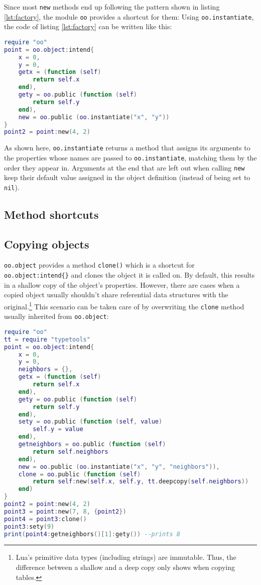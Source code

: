Since most \texttt{new} methods end up following the pattern shown in listing \ref{lst:factory}, the module \texttt{oo} provides a shortcut for them: Using \texttt{oo.instantiate}, the code of listing \ref{lst:factory} can be written like this:

\begin{lstlisting}[language=lua, caption={Rewriting listing \ref{lst:factory} using \texttt{oo.instantiate}}, label=lst:instantiate, name=lst:instantiate]
require "oo"
point = oo.object:intend{
	x = 0,
	y = 0,
	getx = (function (self)
		return self.x
	end),
	gety = oo.public (function (self)
		return self.y
	end),
	new = oo.public (oo.instantiate("x", "y"))
}
point2 = point:new(4, 2)
\end{lstlisting}

As shown here, \texttt{oo.instantiate} returns a method that assigns its arguments to the properties whose names are passed to \texttt{oo.instantiate}, matching them by the order they appear in. Arguments at the end that are left out when calling \texttt{new} keep their default value assigned in the object definition (instead of being set to \texttt{nil}).

\subsection{Method shortcuts}

\subsection{Copying objects}
\label{sec:oo:copying}
\texttt{oo.object} provides a method \texttt{clone()} which is a shortcut for \texttt{oo.object:intend\{\}} and clones the object it is called on. By default, this results in a shallow copy of the object's properties. However, there are cases when a copied object usually shouldn't share referential data structures with the original.\footnote{Lua's primitive data types (including strings) are immutable. Thus, the difference between a shallow and a deep copy only shows when copying tables.} This scenario can be taken care of by overwriting the \texttt{clone} method usually inherited from \texttt{oo.object}:

\begin{lstlisting}[language=lua, caption={Overwriting the \texttt{clone} method}, label=lst:clone, name=lst:clone]
require "oo"
tt = require "typetools"
point = oo.object:intend{
	x = 0,
	y = 0,
	neighbors = {},
	getx = (function (self)
		return self.x
	end),
	gety = oo.public (function (self)
		return self.y
	end),
	sety = oo.public (function (self, value)
		self.y = value
	end),
	getneighbors = oo.public (function (self)
		return self.neighbors
	end),
	new = oo.public (oo.instantiate("x", "y", "neighbors")),
	clone = oo.public (function (self)
		return self:new(self.x, self.y, tt.deepcopy(self.neighbors))
	end)
}
point2 = point:new(4, 2)
point3 = point:new(7, 8, {point2})
point4 = point3:clone()
point3:sety(9)
print(point4:getneighbors()[1]:gety()) --prints 8

\end{lstlisting}

